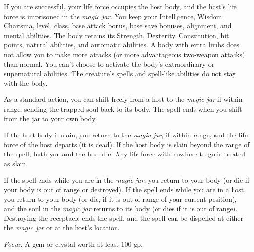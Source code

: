 If you are successful, your life force occupies the host body, and the host's life 
force is imprisoned in the \textit{magic jar}. You keep your Intelligence, Wisdom, 
Charisma, level, class, base attack bonus, base save bonuses, alignment, and mental 
abilities. The body retains its Strength, Dexterity, Constitution, hit points, 
natural abilities, and automatic abilities. A body with extra limbs does not allow 
you to make more attacks (or more advantageous two-weapon attacks) than normal. 
You can't choose to activate the body's extraordinary or supernatural abilities. 
The creature's spells and spell-like abilities do not stay with the body.

As a standard action, you can shift freely from a host to the \textit{magic jar 
}if within range, sending the trapped soul back to its body. The spell ends when 
you shift from the jar to your own body.

If the host body is slain, you return to the \textit{magic jar}, if within range, 
and the life force of the host departs (it is dead). If the host body is slain 
beyond the range of the spell, both you and the host die. Any life force with nowhere 
to go is treated as slain.

If the spell ends while you are in the \textit{magic jar}, you return to your body 
(or die if your body is out of range or destroyed). If the spell ends while you 
are in a host, you return to your body (or die, if it is out of range of your current 
position), and the soul in the \textit{magic jar} returns to its body (or dies 
if it is out of range). Destroying the receptacle ends the spell, and the spell 
can be dispelled at either the \textit{magic jar} or at the host's location.

\textit{Focus:} A gem or crystal worth at least 100 gp.

